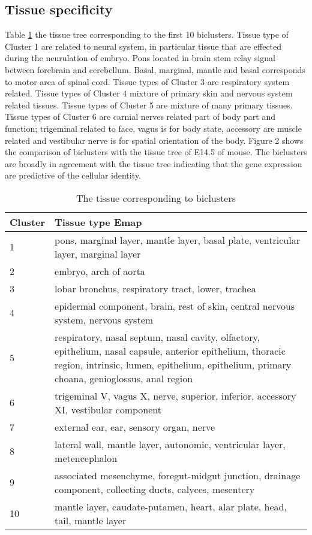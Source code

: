 \documentclass{article}
\begin{document}
\subsection{Tissue specificity}
Table \ref{tab:tissue} the tissue tree corresponding to the first 10 biclusters. Tissue type of Cluster 1 are related to neural system, in particular
tissue that are effected during the neurulation of embryo. Pons located in brain stem relay signal between forebrain and cerebellum. Basal, marginal, mantle and basal corresponds to motor area of spinal cord.
Tissue types of Cluster 3 are respiratory system related.
Tissue types of Cluster 4 mixture of primary skin and nervous system related tissues.
Tissue types of Cluster 5 are mixture of many primary tissues.
Tissue types of Cluster 6 are carnial nerves related part of body part and function; 
trigeminal related to face,
vagus is for body state, accessory are muscle related and vestibular nerve is for spatial orientation of 
the body.
Figure 2 shows the comparison of biclusters with the tissue tree of E14.5 of mouse. The biclusters are
broadly in agreement with the tissue tree indicating that the gene expression 
are predictive of the cellular identity.



\begin{table}
\begin{adjustwidth}{-1in}{-1in}%
	\begin{tabular}{p{1cm}p{15cm}}
\hline
Cluster&Tissue type Emap\\
\hline
\rowcolor{LC}
1&pons, marginal layer, mantle layer, basal plate, ventricular layer, marginal layer\\
2&embryo, arch of aorta\\
\rowcolor{LC}
3&lobar bronchus, respiratory tract, lower, trachea\\
\rowcolor{LC}
4&epidermal component, brain, rest of skin, central nervous system, nervous system\\
\rowcolor{LC}
5&respiratory, nasal septum, nasal cavity, olfactory, epithelium, nasal capsule, anterior epithelium, thoracic region, intrinsic, lumen, epithelium, epithelium, primary choana, genioglossus, anal region\\
\rowcolor{LC}
6&trigeminal V, vagus X, nerve, superior, inferior, accessory XI, vestibular component\\
7&external ear, ear, sensory organ, nerve\\
8&lateral wall, mantle layer, autonomic, ventricular layer, metencephalon\\
9&associated mesenchyme, foregut-midgut junction, drainage component, collecting ducts, calyces, mesentery\\
10&mantle layer, caudate-putamen, heart, alar plate, head, tail, mantle layer\\
\hline
\end{tabular}
\end{adjustwidth}
\caption{The tissue corresponding to biclusters}
\label{tab:tissue}
\end{table}
\end{document}
